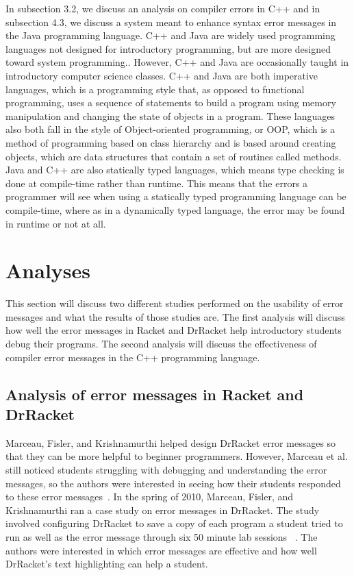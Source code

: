 \documentclass{sig-alternate}
\begin{document}
In subsection 3.2, we discuss an analysis on compiler errors in C++ and in subsection 4.3, we discuss a system meant to enhance syntax error messages in the Java programming language.
C++ and Java are widely used programming languages not designed for introductory programming, but are more designed toward system programming..
However, C++ and Java are occasionally taught in introductory computer science classes.
C++ and Java are both imperative languages, which is a programming style that, as opposed to functional programming, uses a sequence of statements to build a program using memory manipulation and changing the state of objects in a program.
These languages also both fall in the style of Object-oriented programming, or OOP, which is a method of programming based on class hierarchy and is based around creating objects, which are data structures that contain a set of routines called methods. 
Java and C++ are also statically typed languages, which means type checking is done at compile-time rather than runtime. 
This means that the errors a programmer will see when using a statically typed programming language can be compile-time, where as in a dynamically typed language, the error may be found in runtime or not at all. 




\section{Analyses}\label{sec:analyses}
This section will discuss two different studies performed on the usability of error messages and what the results of those studies are.
The first analysis will discuss how well the error messages in Racket and DrRacket help introductory students debug their programs.
The second analysis will discuss the effectiveness of compiler error messages in the C++ programming language. 


\subsection{Analysis of error messages in Racket and DrRacket}\label{racket analysis}
Marceau, Fisler, and Krishnamurthi helped design DrRacket error messages so that they can be more helpful to beginner programmers.
However, Marceau et al. still noticed students struggling with debugging and understanding the error messages, so the authors were interested in seeing how their students responded to these error messages~\cite{Marceau:2011:MYL:2048237.2048241}.
In the spring of 2010, Marceau, Fisler, and Krishnamurthi ran a case study on error messages in DrRacket.
The study involved configuring DrRacket to save a copy of each program a student tried to run as well as the error message through six 50 minute lab sessions ~\cite{Marceau:2011:MEE:1953163.1953308}.
The authors were interested in which error messages are effective and how well DrRacket's text highlighting can help a student.  
\end{document}
